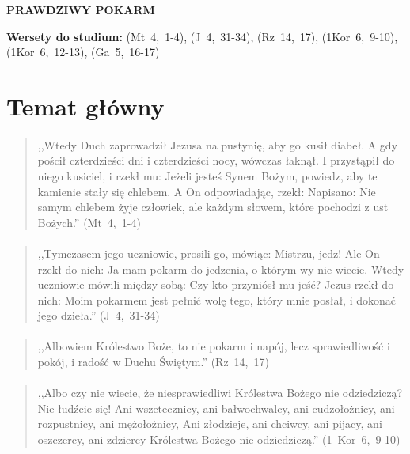 \documentclass[10pt,a4paper,oneside]{article}
\begin{document}
\centerline{\textbf{\MakeUppercase{Prawdziwy pokarm}}}
\begin{center}
\textbf{Wersety do studium:} 
\mbox{(Mt 4, 1-4)}, \mbox{(J 4, 31-34)}, \mbox{(Rz 14, 17)}, \mbox{(1Kor 6, 9-10)}, \mbox{(1Kor 6, 12-13)}, \mbox{(Ga 5, 16-17)}
\end{center}
\section{Temat główny}
\paragraph{}
\begin{quote}
,,Wtedy Duch zaprowadził Jezusa na pustynię, aby go kusił diabeł. A gdy pościł czterdzieści dni i czterdzieści nocy, wówczas łaknął. I przystąpił do niego kusiciel, i rzekł mu: Jeżeli jesteś Synem Bożym, powiedz, aby te kamienie stały się chlebem. A On odpowiadając, rzekł: Napisano: Nie samym chlebem żyje człowiek, ale każdym słowem, które pochodzi z ust Bożych.'' \mbox{(Mt 4, 1-4)}
\end{quote}
\paragraph{}
\begin{quote}
,,Tymczasem jego uczniowie, prosili go, mówiąc: Mistrzu, jedz! Ale On rzekł do nich: Ja mam pokarm do jedzenia, o którym wy nie wiecie. Wtedy uczniowie mówili między sobą: Czy kto przyniósł mu jeść? Jezus rzekł do nich: Moim pokarmem jest pełnić wolę tego, który mnie posłał, i dokonać jego dzieła.'' \mbox{(J 4, 31-34)}
\end{quote}
\paragraph{}
\begin{quote}
,,Albowiem Królestwo Boże, to nie pokarm i napój, lecz sprawiedliwość i pokój, i radość w Duchu Świętym.'' \mbox{(Rz 14, 17)}
\end{quote}
\paragraph{}
\begin{quote}
,,Albo czy nie wiecie, że niesprawiedliwi Królestwa Bożego nie odziedziczą? Nie łudźcie się! Ani wszetecznicy, ani bałwochwalcy, ani cudzołożnicy, ani rozpustnicy, ani mężołożnicy, Ani złodzieje, ani chciwcy, ani pijacy, ani oszczercy, ani zdziercy Królestwa Bożego nie odziedziczą.'' \mbox{(1 Kor 6, 9-10)}
\end{quote}
\end{document}
